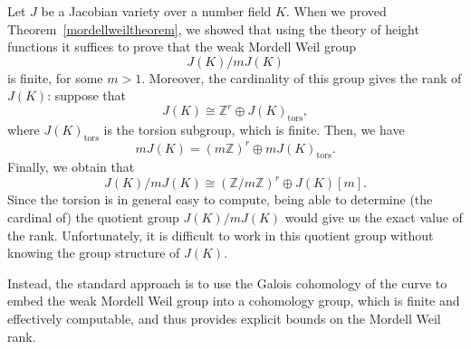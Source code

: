 \documentclass[a4paper, 12pt]{amsart}
\theoremstyle{definition}
\theoremstyle{plain}
\theoremstyle{plain}
\theoremstyle{plain}
\theoremstyle{plain}
\theoremstyle{remark}
\theoremstyle{remark}
\theoremstyle{plain}
\newcommand{\thmref}[1]{Theorem~\ref{#1}}
\newcommand{\Z}{\mathbb{Z}}
\newcommand{\Zmod}[1]{\mathbb{Z}/#1\mathbb{Z}}
\begin{document}
	Let $J$ be a Jacobian variety over a number field $K$. When we proved \thmref{mordellweiltheorem}, we showed that using the theory of height functions it suffices to prove that the weak Mordell Weil group
	\begin{equation*}
		J(K)/mJ(K)
	\end{equation*}
	is finite, for some $m>1$. Moreover, the cardinality of this group gives the rank of $J(K)$: suppose that
	\begin{equation*}
		J(K)\cong\Z^r\oplus J(K)_{\text{tors}},
	\end{equation*}
	where $J(K)_{\text{tors}}$ is the torsion subgroup, which is finite. Then, we have
	\begin{equation*}
		mJ(K)=(m\Z)^r\oplus mJ(K)_{\text{tors}}.
	\end{equation*}
	Finally, we obtain that
	\begin{equation*}
		J(K)/mJ(K)\cong (\Zmod{m})^r\oplus J(K)[m].
	\end{equation*}
	Since the torsion is in general easy to compute, being able to determine (the cardinal of) the quotient group $J(K)/mJ(K)$ would give us the exact value of the rank. Unfortunately, it is difficult to work in this quotient group without knowing the group structure of $J(K)$.
	
	Instead, the standard approach is to use the Galois cohomology of the curve to embed the weak Mordell Weil group into a cohomology group, which is finite and effectively computable, and thus provides explicit bounds on the Mordell Weil rank.
	
\end{document}
